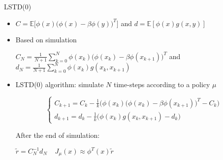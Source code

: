 \documentclass{beamer}
\def\E{{\mathbb E}}
\begin{document}
\begin{frame}{LSTD(0)}



\begin{itemize}
\item $C = \E\Big[\phi(x)\Big(\phi(x) - \beta \phi(y) \Big)^T\Big]$ and $d = \E[ \phi(x)g(x, y)]$


\item Based on simulation

\begin{center}
$C_N =\frac{1}{N+1}\sum\limits_{k=0}^N\phi(x_k)\Big(\phi(x_k) - \beta \phi(x_{k+1}) \Big)^T $ and  $d_N = \frac{1}{N+1}\sum\limits_{k=0}^N \phi(x_k)g(x_k, x_{k+1})$
\end{center}

\item LSTD(0) algorithm: simulate $N$ time-steps according to a policy $\mu$

\begin{equation*}
\begin{cases}
C_{k+1} = C_k - \frac{1}{k}\Big(\phi(x_k)\Big(\phi(x_k) - \beta \phi(x_{k+1}) \Big)^T -C_k\Big )\\

d_{k+1} = d_k - \frac{1}{k}\Big( \phi(x_k)g(x_k, x_{k+1}) -d_k\Big)
\end{cases}
\end{equation*}

After the end of simulation:
\begin{center}
$\tilde r =  C_{N}^{-1}d_N~~~~~J_\mu(x) \approx \phi^T(x)\tilde r$
\end{center}
\end{itemize}
\end{frame}
\end{document}
